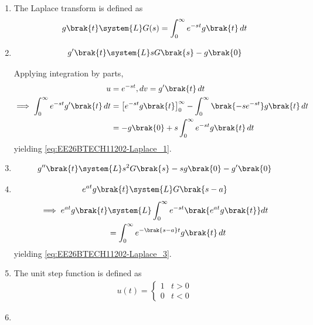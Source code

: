 \begin{enumerate}[label=\thesubsection.\arabic*, ref=\thesubsection.\theenumi]
\item The Laplace transform is defined as
\begin{align}
g\brak{t} \system{L} G(s) = \int_{0}^{\infty} e^{-st} g\brak{t} \, dt
\end{align}
\item \begin{align}
g^{\prime}\brak{t} \system{L}s G\brak{s}-g\brak{0} \label{eq:EE26BTECH11202-Laplace_1}
\end{align}
\solution 

Applying integration by parts, 
\begin{align}
	u &= e^{-st}, dv = g^{\prime}\brak{t} \, dt 
\\
\implies \int_{0}^{\infty} e^{-st} g^{\prime}\brak{t} \, dt
	  &=
 \left[ e^{-st} g\brak{t} \right]_{0}^{\infty} - \int_{0}^{\infty} \brak{-s e^{-st}} g\brak{t} \, dt \\
	  &=   - g\brak{0}  + s \int_{0}^{\infty} e^{-st} g\brak{t} \, dt 
\end{align}
yielding \eqref{eq:EE26BTECH11202-Laplace_1}.
\item 
\begin{align}
g^{\prime \prime}\brak{t} \system{L} s^2 G\brak{s} -sg\brak{0}-g^{\prime}\brak{0} \label{eq:EE26BTECH11202-Laplace_2}
\end{align}
\item 
\begin{align}
	e^{at} g\brak{t} \system{L} G\brak{s-a} \label{eq:EE26BTECH11202-Laplace_3}
\end{align}
\solution
\begin{align}
	\implies e^{at} g\brak{t} &\system{L} \int_{0}^{\infty} e^{-st} \brak{e^{at} g\brak{t}} dt
	\\
				  &= \int_{0}^{\infty} e^{-\brak{s - a}t} g\brak{t} \, dt
\end{align}
yielding
\eqref{eq:EE26BTECH11202-Laplace_3}.
\item The unit step function is defined as
\begin{align}
	u(t) = 
	\begin{cases}
		1 & t > 0
		\\
		0 & t < 0
	\end{cases}\label{eq:EE26BTECH11202-step-func}
\end{align}
\item 
\begin{align}

\end{align}
\end{enumerate}
